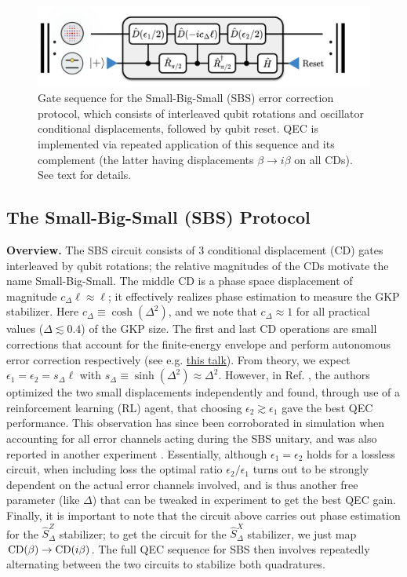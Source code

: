 \begin{figure}[h]
    \centering
    \includegraphics[width=0.83\linewidth]{Figures/2/SBS.pdf}
    \caption[Gate sequence for the Small-Big-Small (SBS) open-loop GKP error correction protocol.]{Gate sequence for the Small-Big-Small (SBS) error correction protocol, which consists of interleaved qubit rotations and oscillator conditional displacements, followed by qubit reset. QEC is implemented via repeated application of this sequence and its complement (the latter having displacements $\beta \to i\beta$ on all CDs). See text for details.}
    \label{fig:2-SBS}
\end{figure}

\subsection{The Small-Big-Small (SBS) Protocol\label{sec:2_SBS}}
\textbf{Overview.} The SBS circuit consists of 3 conditional displacement (CD) gates interleaved by qubit rotations; the relative magnitudes of the CDs motivate the name Small-Big-Small. The middle CD is a phase space displacement of magnitude $c_\Delta \ell \approx \ell$; it effectively realizes phase estimation to measure the GKP stabilizer. Here $c_\Delta \equiv \cosh(\Delta^2)$, and we note that $c_\Delta \approx 1$ for all practical values ($\Delta \lesssim 0.4$) of the GKP size. The first and last CD operations are small corrections that account for the finite-energy envelope and perform autonomous error correction respectively (see e.g. \href{https://youtu.be/TOQzHkgsH_E?t=1045}{this talk}). From theory, we expect $\epsilon_1 = \epsilon_2 = s_\Delta \ell$ with $s_\Delta \equiv \sinh(\Delta^2) \approx \Delta^2$. However, in Ref. \cite{sivak2023gkp-expt}, the authors optimized the two small displacements independently and found, through use of a reinforcement learning (RL) agent, that choosing $\epsilon_2 \gtrsim \epsilon_1$ gave the best QEC performance. This observation has since been corroborated in simulation when accounting for all error channels acting during the SBS unitary, and was also reported in another experiment \cite{nordquantique2023gkp-expt}. Essentially, although $\epsilon_1 = \epsilon_2$ holds for a lossless circuit, when including loss the optimal ratio $\epsilon_2/\epsilon_1$ turns out to be strongly dependent on the actual error channels involved, and is thus another free parameter (like $\Delta$) that can be tweaked in experiment to get the best QEC gain. Finally, it is important to note that the circuit above carries out phase estimation for the $\hat{S}_\Delta^{Z}$ stabilizer; to get the circuit for the $\hat{S}_\Delta^{X}$ stabilizer, we just map ${\rm CD}(\beta) \to {\rm CD}(i\beta)$. The full QEC sequence for SBS then involves repeatedly alternating between the two circuits to stabilize both quadratures. 

